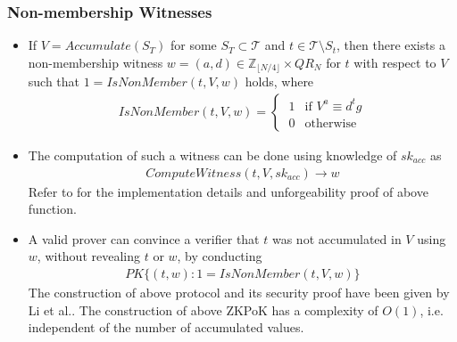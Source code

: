 \documentclass[12pt]{article}
\newcommand{\PK}[2]{\ensuremath{PK\{(#1): #2\}}}
\begin{document}
\subsubsection*{Non-membership Witnesses}
\begin{itemize}
	\item If $V = Accumulate(S_T)$ for some $S_T \subset \mathcal{T}$ and $t \in \mathcal{T}\setminus S_t$, then there exists a non-membership witness $w = (a, d) \in \mathbb{Z}_{\lfloor N/4 \rfloor} \times QR_N$ for $t$ with respect to $V$ such that $1 = IsNonMember(t, V, w)$ holds, where
	\begin{align}
		IsNonMember(t, V, w) = \begin{cases}
			\ 1 & \text{if } V^{a} \equiv d^t g\\
			\ 0 & \text{otherwise}
		\end{cases} 
	\end{align}
	\item The computation of such a witness can be done using knowledge of $sk_{acc}$ as
	\begin{align}
		 ComputeWitness(t, V, sk_{acc}) \rightarrow w
	\end{align}
	Refer to \cite*{Li} for the implementation details and unforgeability proof of above function.
	\item A valid prover can convince a verifier that $t$ was not accumulated in $V$ using $w$, without revealing $t$ or $w$, by conducting
	\begin{align}
		\PK{t, w}{1 = IsNonMember(t, V, w)} 
	\end{align}
	The construction of above protocol and its security proof have been given by Li et al.\cite*{Li}. The construction of above ZKPoK has a complexity of $O(1)$, i.e. independent of the number of accumulated values. 
\end{itemize}
\end{document}
